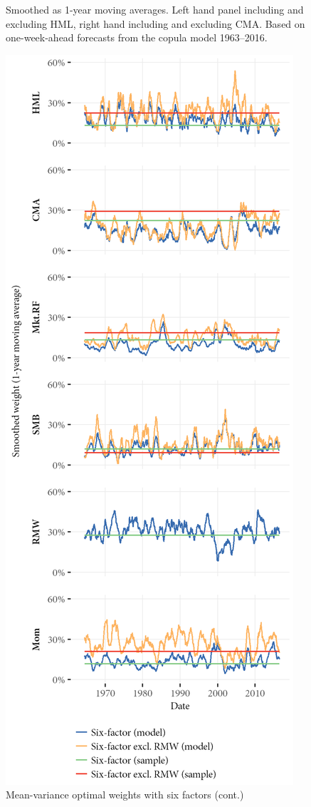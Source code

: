 \begin{figure}[htbp]
  \begin{longcaption}
    Smoothed as 1-year moving averages. Left hand panel including and excluding HML, right hand including and excluding CMA. Based on one-week-ahead forecasts from the copula model 1963--2016.
  \end{longcaption}
\end{figure}

\begin{figure}[htbp]
  \ContinuedFloat
  \centering
  \includegraphics[scale=1]{graphics/weights/main_Weights_MV_6F_6F_EXCL_RMW.png}
  \footnotesize
  \caption{Mean-variance optimal weights with six factors (cont.)}
  \label{fig:mv_optimal_6}
\end{figure}



